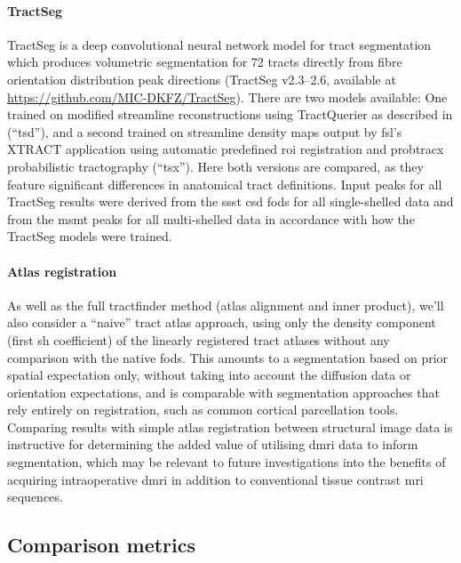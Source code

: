 \paragraph*{TractSeg}

TractSeg \autocite{Wasserthal2018} is a deep convolutional neural network model for tract segmentation which produces volumetric segmentation for 72 tracts directly from fibre orientation distribution peak directions (TractSeg v2.3--2.6, available at \url{https://github.com/MIC-DKFZ/TractSeg}).
There are two models available: One trained on modified streamline reconstructions using TractQuerier \autocite{Wassermann2016} as described in \textcite{Wasserthal2018} (``\gls{tsd}''), and a second trained on streamline density maps output by \gls{fsl}'s XTRACT \autocite{Warrington2020} application using automatic predefined \gls{roi} registration and probtracx probabilistic tractography\autocite{Behrens2007} (``\gls{tsx}'').
Here both versions are compared, as they feature significant differences in anatomical tract definitions.
Input peaks for all TractSeg results were derived from the \gls{ssst} \gls{csd} \glspl{fod} for all single-shelled data and from the \gls{msmt} peaks for all multi-shelled data in accordance with how the TractSeg models were trained.

\paragraph*{Atlas registration}

As well as the full tractfinder method (atlas alignment and inner product), we'll also consider a ``naive'' tract atlas approach, using only the density component (first \gls{sh} coefficient) of the linearly registered tract atlases without any comparison with the native \glspl{fod}.
This amounts to a segmentation based on prior spatial expectation only, without taking into account the diffusion data or orientation expectations, and is comparable with segmentation approaches that rely entirely on registration, such as common cortical parcellation tools.
Comparing results with simple atlas registration between structural image data is instructive for determining the added value of utilising \gls{dmri} data to inform segmentation, which may be relevant to future investigations into the benefits of acquiring intraoperative \gls{dmri} in addition to conventional tissue contrast \gls{mri} sequences.

\subsection{Comparison metrics}\label{sec:metrics}


